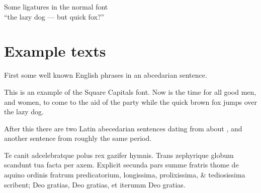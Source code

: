 \documentclass{article}
\newcommand{\Romannum}[1]{\uppercase\expandafter{\romannumeral #1}}
\newcommand{\Sentence}{%
This is an example of the Square Capitals font. Now is the time for all good
men, and women, to come to the aid of the party while the quick brown fox
jumps over the lazy dog.}
\newcommand{\latin}{Te canit adcelebratque polus rex gazifer hymnis.
  Trans zephyrique globum scandunt tua facta per axem.
  Explicit secunda pars summe fratris thome de aquino ordinis fratrum 
  predicatorium, longissima, prolixissima, \& tediosissima scribent;
  Deo gratias, Deo gratias, et iterumm Deo gratias. }
\begin{document}
\begin{center}
    Some ligatures in the normal font \\
{``the lazy dog --- but quick fox?''}
\end{center}

\section{Example texts}

    First some well known English phrases in an abcedarian sentence.

\Sentence{}

    After this there are two Latin abecedarian sentences dating from about 
\Romannum{790}, and another sentence from roughly the same period.

\latin{}

    
\end{document}
